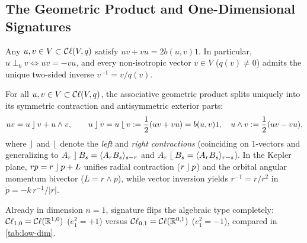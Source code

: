 \documentclass[11pt,a4paper]{article}
\begin{document}
\subsection{The Geometric Product and One-Dimensional Signatures}
\label{subsec:geom-product}

\begin{proposition}
  \label{prop:polarization}
  Any $u, v \in V \subset \mathcal{C}\ell(V, q)$ satisfy $uv + vu = 2b(u, v) 1$.
  In particular, $u \perp_b v \iff uv = -vu$, and every non-isotropic vector
  $v \in V$ ($q(v) \neq 0$) admits the unique two-sided inverse
  $v^{-1} = v / q(v)$.
\end{proposition}

\begin{keyresult}
  For all $u, v \in V \subset \mathcal{C}\ell(V, q)$, the associative geometric product
  splits uniquely into its symmetric contraction and antisymmetric exterior
  parts:
  \begin{equation}
    \label{eq:geometric-product}
    uv = u \mathbin{\rfloor} v + u \wedge v, \qquad
    u \mathbin{\rfloor} v = u \mathbin{\lfloor} v := \frac{1}{2}(uv + vu) = b(u, v) 1, \quad
    u \wedge v := \frac{1}{2}(uv - vu),
  \end{equation}
  where $\mathbin{\rfloor}$ and $\mathbin{\lfloor}$ denote the \emph{left} and \emph{right contractions}
  (coinciding on $1$-vectors and generalizing to $A_r \lc B_s =
  \grade{A_r B_s}{s-r}$ and $A_r \rc B_s = \grade{A_r B_s}{r-s}$).
  In the Kepler plane, $rp = r \mathbin{\rfloor} p + L$ unifies radial contraction
  ($r \mathbin{\rfloor} p$) and the orbital angular momentum bivector ($L = r \wedge p$),
  while vector inversion yields $r^{-1} = r / r^2$ in
  $\dot{p} = -k\, r^{-1}/|r|$.
\end{keyresult}

Already in dimension $n = 1$, signature flips the algebraic type completely:
$\mathcal{C}\ell_{1,0} = \mathcal{C}\ell(\mathbb{R}^{1,0})$ ($e_1^2 = +1$) versus $\mathcal{C}\ell_{0,1} = \mathcal{C}\ell(\mathbb{R}^{0,1})$
($e_1^2 = -1$), compared in \cref{tab:low-dim}.
\end{document}
